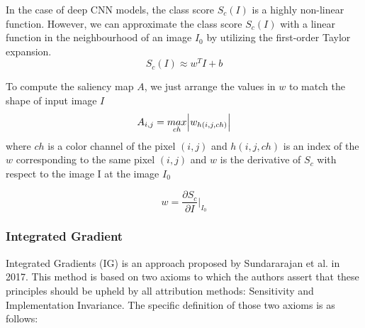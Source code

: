 In the case of deep CNN models, the class score $S_c(I)$ is a highly non-linear function. However, we can approximate the class score $S_c(I)$ with a linear function in the neighbourhood of an image $I_0$ by utilizing the first-order Taylor expansion.
\begin{equation}
    S_c(I) \approx w^T I + b
\end{equation}

To compute the saliency map $A$, we just arrange the values in $w$ to match the shape of input image $I$ 
\begin{equation}
A_{i, j} = \underset{ch}{max}\abs{w_{h(i, j, ch)}}
\end{equation}
 where $ch$ is a color channel of the pixel $(i,j)$ and $h(i,j,ch)$ is an index of the $w$ corresponding to the same pixel $(i,j)$ and $w$ is the derivative of $S_c$ with respect to the image I at the image $I_0$

\begin{equation}
    w = \frac{\partial S_c}{\partial I} \bigg \rvert_{I_0}
\end{equation}

\subsubsection{Integrated Gradient}
\label{subsubsec: IG}
Integrated Gradients (IG) is an approach proposed by Sundararajan et al. \cite{IG} in 2017. This method is based on two axioms to which the authors assert that these principles should be upheld by all attribution methods: Sensitivity and Implementation Invariance. The specific definition of those two axioms is as follows:


